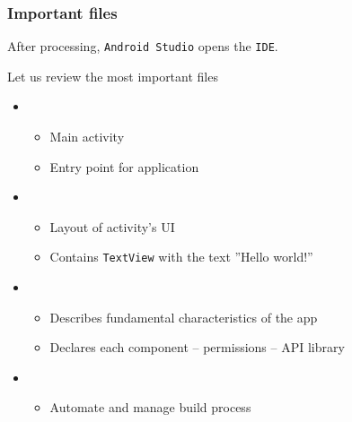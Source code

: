 %
%

\begin{frame}
  \frametitle{Important files}
  
  After processing, \texttt{Android Studio} opens the \texttt{IDE}.  

  Let us review the most important files

  \begin{itemize}
  \item<1-> 
    
    \begin{itemize}
    \item<1-> Main activity
    \item<1-> Entry point for application
    \end{itemize}

  \item<2-> 
    
    \begin{itemize}
    \item<2-> Layout of activity's UI
    \item<2-> Contains \texttt{TextView} with the text ''Hello world!''
    \end{itemize}

  \item<3-> 
    
    \begin{itemize}
    \item<3-> Describes fundamental characteristics of the app
    \item<3-> Declares each component -- permissions -- API library
    \end{itemize}

  \item<4-> 

    \begin{itemize}
    \item<4-> Automate and manage build process
    \end{itemize}

  \end{itemize}

\end{frame}

